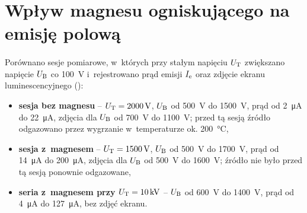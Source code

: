 \providecommand{\sesjaM}{z~magnesem}
\providecommand{\sesjaB}{bez magnesu}
\providecommand{\figdir}{figures}
\providecommand{\datadir}{dane}
\providecommand{\TODO}[1]{\textcolor{red}{[TODO: #1]}}

\section{Wpływ magnesu ogniskującego na emisję polową}
\label{sec:emisja-magnes}

\paragraph{}

Porównano sesje pomiarowe, w~których przy stałym napięciu $U_\mathrm{T}$
zwiększano napięcie $U_\mathrm{B}$ co \SI{100}{V} i~rejestrowano prąd emisji
$I_\mathrm{e}$ oraz zdjęcie ekranu luminescencyjnego ():
\begin{itemize}
  \item \textbf{sesja bez magnesu} -- $U_\mathrm{T}=\SI{2000}{V}$,
        $U_\mathrm{B}$ od \SI{500}{V} do \SI{1500}{V}, prąd od \SI{2}{\micro A}
        do \SI{22}{\micro A}, zdjęcia dla $U_\mathrm{B}$ od \SI{700}{V}
        do \SI{1100}{V}; przed tą sesją źródło odgazowano
        przez wygrzanie w~temperaturze ok. \SI{200}{\celsius},
  \item \textbf{sesja z~magnesem} -- $U_\mathrm{T}=\SI{1500}{V}$,
        $U_\mathrm{B}$ od \SI{500}{V} do \SI{1700}{V}, prąd od \SI{14}{\micro A}
        do \SI{200}{\micro A}, zdjęcia dla $U_\mathrm{B}$ od \SI{500}{V}
        do \SI{1600}{V}; źródło nie było przed tą sesją
        ponownie odgazowane,
  \item \textbf{seria z~magnesem przy $U_\mathrm{T}=\SI{10}{kV}$} --
        $U_\mathrm{B}$ od \SI{600}{V} do \SI{1400}{V}, prąd od \SI{4}{\micro A}
        do \SI{127}{\micro A}, bez zdjęć ekranu.
\end{itemize}

